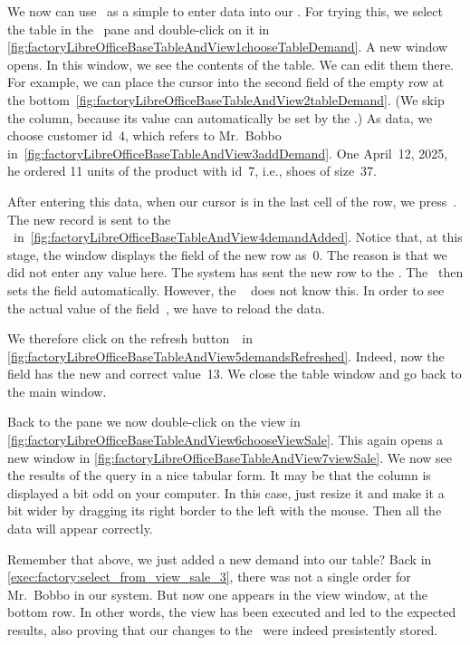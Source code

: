 %
We now can use \libreofficeBase\ as a simple  to enter data into our \db.
For trying this, we select the table  in the ~pane and double-click on it in \cref{fig:factoryLibreOfficeBaseTableAndView1chooseTableDemand}.
A new window opens.
In this window, we see the contents of the table.
We can edit them there.
For example, we can place the cursor into the second field of the empty row at the bottom~\cref{fig:factoryLibreOfficeBaseTableAndView2tableDemand}.
(We skip the  column, because its value can automatically be set by the \dbms.)
As data, we choose customer id~4, which refers to Mr.~Bobbo in~\cref{fig:factoryLibreOfficeBaseTableAndView3addDemand}.
One April~12, 2025, he ordered 11 units of the product with id~7, i.e., shoes of size~37.

After entering this data, when our cursor is in the last cell of the row, we press~\keys{\tab}.
The new record is sent to the \dbms\ in~\cref{fig:factoryLibreOfficeBaseTableAndView4demandAdded}.
Notice that, at this stage, the window displays the  field of the new row as~0.
The reason is that we did not enter any value here.
The system has sent the new row to the \dbms.
The \dbms\ then sets the  field automatically.
However, the \libreofficeBase\  does not know this.
In order to see the actual value of the field~, we have to reload the data.

We therefore click on the refresh button~\libreOfficeBaseRefresh\ in \cref{fig:factoryLibreOfficeBaseTableAndView5demandsRefreshed}.
Indeed, now the  field has the new and correct value~13.
We close the table window and go back to the main window.

Back to the  pane we now double-click on the view  in \cref{fig:factoryLibreOfficeBaseTableAndView6chooseViewSale}.
This again opens a new window in \cref{fig:factoryLibreOfficeBaseTableAndView7viewSale}.
We now see the results of the query in a nice tabular form.
It may be that the  column is displayed a bit odd on your computer.
In this case, just resize it and make it a bit wider by dragging its right border to the left with the mouse.
Then all the data will appear correctly.

Remember that above, we just added a new demand into our table?
Back in \cref{exec:factory:select_from_view_sale_3}, there was not a single order for Mr.~Bobbo in our system.
But now one appears in the view window, at the bottom row.
In other words, the view has been executed and led to the expected results, also proving that our changes to the \db\ were indeed presistently stored.%
%
\FloatBarrier%
\endhsection%
%
